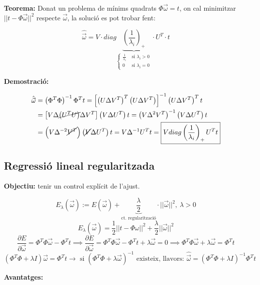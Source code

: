 \documentclass[a4paper]{article}
\begin{document}
\textbf{Teorema:} Donat un problema de mínims quadrats $ \Phi \vec{\omega} = t $, on cal minimitzar $ ||t - \Phi \vec{\omega} ||^2 $ respecte $\vec{\omega}$, la solució es pot trobar fent:

$$
\hat{\vec{\omega}} = V · diag \underbrace{\left( \frac{1}{\lambda_i}\right)_+}_{\begin{cases}
	\frac{1}{\lambda_i} &\text{ si } \lambda_i > 0 \\
	0 & \text{ si } \lambda_i = 0
	\end{cases}}  · U^T · t
$$

\textbf{Demostració:}

\begin{align*}
\hat{\vec{\omega}} &= \left( \Phi^T \Phi \right)^{-1} \Phi^T t =
\left[ \left( U \Delta V^T \right)^T \left( U\Delta V^T \right) \right]^{-1}
\left(U\Delta V^T\right)^T t \\
& = \left[ V\Delta \cancel{\left( U^T U \right)} \Delta V^T \right] 
\left( V \Delta U^T \right) t = 
\left( V \Delta^2 V^T \right)^{-1} \left( V \Delta U^T \right) t \\ 
&=
\left( V \Delta^{-2} \cancel{V^T} \right) \left( \cancel{V} \Delta U^T \right) t = V \Delta^{-1} U^T t = 
\boxed{V diag\left(\frac{1}{\lambda_i}\right)_+ U^T t}
\end{align*}

\subsection{Regressió lineal regularitzada}

\textbf{Objectiu:} tenir un control explícit de l'ajust.

$$
E_{\lambda} (\vec{\omega}) := E(\vec{\omega}) + \underbrace{\frac{\lambda}{2}}_{\text{ct. regularització}}·||\vec{\omega}||^2, \ \lambda > 0
$$
$$
E_{\lambda}(\vec{\omega}) = \frac{1}{2} || t - \Phi \omega ||^2 + \frac{\lambda}{2} || \vec{\omega} ||^2
$$
$$
\frac{\partial E}{\partial \vec{\omega}} = 
\Phi^T \Phi \vec{\omega} - \Phi^T t \implies
\frac{\partial E}{\partial \vec{\omega}} = 
\Phi^T \Phi \vec{\omega} - \Phi^T t + \lambda \vec{\omega} = 0 \implies
\Phi^T \Phi \vec{\omega} + \lambda \vec{\omega} = \Phi^T t
$$
$$
\left( \Phi^T \Phi + \lambda I \right) \vec{\omega} = \Phi^T t \rightarrow
\text{ si } \left( \Phi^T \Phi + \lambda \vec{\omega} \right)^{-1} 
\text{ existeix, llavors: } \hat{\vec{\omega}} = 
\left( \Phi^T \Phi + \lambda I \right)^{-1} \Phi^T t
$$

\textbf{Avantatges:}
\end{document}
